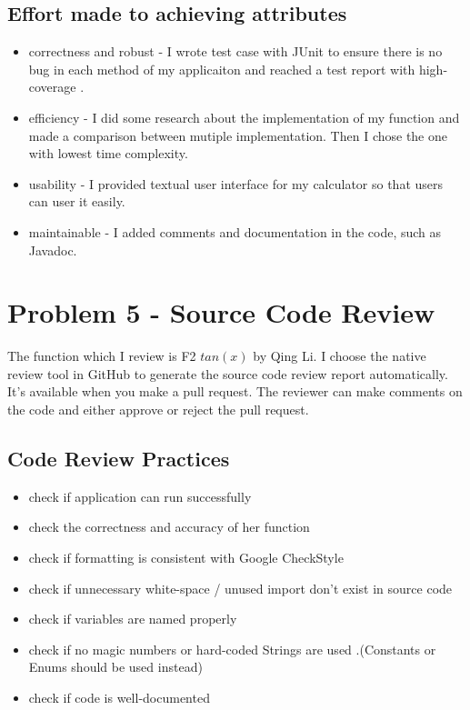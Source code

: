 \documentclass[10pt]{article}
\begin{document}
\subsection{Effort made to achieving attributes}
\begin{itemize}
    \item correctness and robust - I wrote test case with JUnit to ensure there is no bug in each method of my applicaiton and reached a test report with high-coverage .
    \item efficiency - I did some research about the implementation of my function and made a comparison between mutiple implementation. Then I chose the one with lowest time complexity.
    \item usability - I provided textual user interface for my calculator so that users can user it easily.
    \item maintainable - I added comments and documentation in the code, such as Javadoc.
\end{itemize}


\pagebreak
\section{Problem 5 - Source Code Review}
The function which I review is F2 $tan(x)$ by Qing Li. I choose the native review tool in GitHub to generate the source code review report automatically. It's available when you make a pull request. The reviewer can make comments on the code and either approve or reject the pull request.

\subsection{Code Review Practices}
\begin{itemize}
    \item check if application can run successfully 
    \item check the correctness and accuracy of her function
    \item check if formatting is consistent with Google CheckStyle
    \item check if unnecessary white-space / unused import don't exist in source code
    \item check if variables are named properly
    \item check if no magic numbers or hard-coded Strings are used .(Constants or Enums should be used instead)
    \item check if code is well-documented
\end{itemize}
\end{document}
